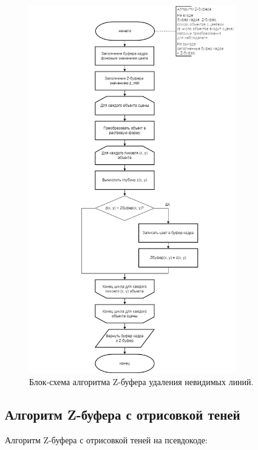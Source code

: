 \begin{figure}[H]
    \centering
    \includegraphics[width=0.8\textwidth]{img/block_1.png}
    \caption{Блок-схема алгоритма Z-буфера удаления невидимых линий.}
    \label{fig:block_Zbuff}
\end{figure}


\subsection{Алгоритм Z-буфера с отрисовкой теней}

\hspace{1.25cm}
Алгоритм Z-буфера с отрисовкой теней на псевдокоде:

